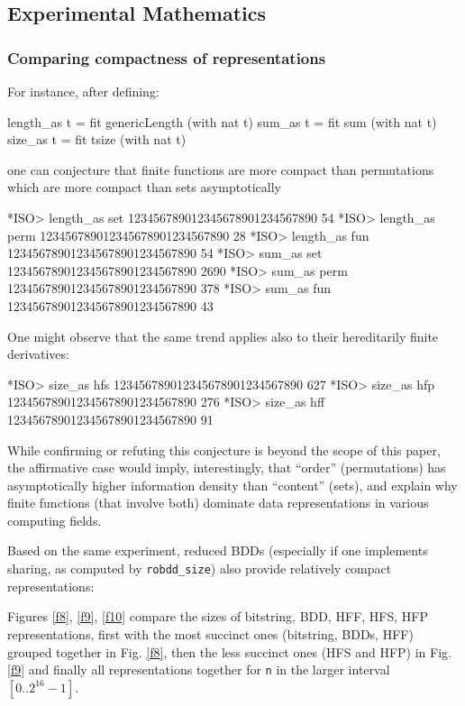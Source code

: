 \documentclass[]{INCLUDES/llncs}
\begin{document}
\subsection{Experimental Mathematics}

\subsubsection{Comparing compactness of representations}

For instance, after defining:
\begin{code}
length_as t = fit genericLength (with nat t)
sum_as t = fit sum (with nat t)
size_as t = fit tsize (with nat t)
\end{code}
one can conjecture that finite functions are more compact than
permutations which are more compact than sets asymptotically
\begin{codex}
*ISO> length_as set 123456789012345678901234567890
54
*ISO> length_as perm 123456789012345678901234567890
28
*ISO> length_as fun 123456789012345678901234567890
54
*ISO> sum_as set 123456789012345678901234567890
2690
*ISO> sum_as perm 123456789012345678901234567890
378
*ISO> sum_as fun 123456789012345678901234567890
43
\end{codex}
One might observe that the same trend applies also
to their hereditarily finite derivatives:
\begin{codex}
*ISO> size_as hfs 123456789012345678901234567890
627
*ISO> size_as hfp 123456789012345678901234567890
276
*ISO> size_as hff 123456789012345678901234567890
91
\end{codex}
While confirming or refuting this conjecture is beyond the
scope of this paper, the affirmative case would imply,
interestingly, that ``order'' (permutations) has
asymptotically higher information density than ``content'' (sets),
and explain why finite functions (that involve both) dominate
data representations in various computing fields. 

Based on the same experiment, reduced BDDs
(especially if one implements sharing, as computed by {\tt robdd\_size})
also provide relatively compact representations:
Figures \ref{f8}, \ref{f9}, \ref{f10} compare the sizes of bitstring,
BDD, HFF, HFS, HFP representations, 
first with the most succinct ones  (bitstring, BDDs, HFF) grouped
together in Fig. \ref{f8}, 
then the less succinct ones (HFS and HFP) in Fig. \ref{f9} 
and finally all representations together for
{\tt n} in the larger interval $[0..2^{16}-1]$.
\end{document}
